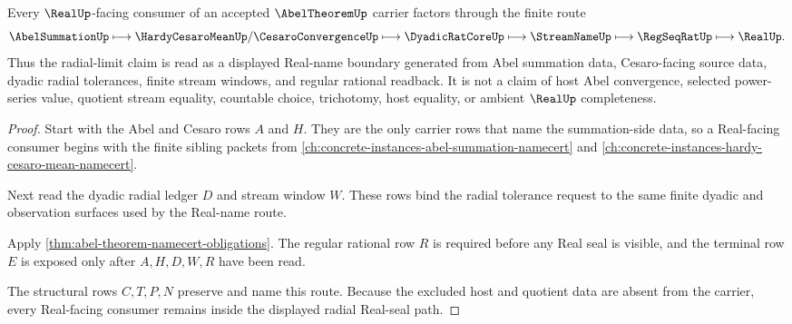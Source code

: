 \begin{theorem}
\label{thm:abel-theorem-radial-real-seal-route}
Every $\RealUp$-facing consumer of an accepted $\AbelTheoremUp$ carrier factors through the finite route
$$
\AbelSummationUp \longmapsto \HardyCesaroMeanUp/\CesaroConvergenceUp \longmapsto \DyadicRatCoreUp \longmapsto \StreamNameUp \longmapsto \RegSeqRatUp \longmapsto \RealUp .
$$
Thus the radial-limit claim is read as a displayed Real-name boundary generated from Abel summation data, Cesaro-facing source data, dyadic radial tolerances, finite stream windows, and regular rational readback. It is not a claim of host Abel convergence, selected power-series value, quotient stream equality, countable choice, trichotomy, host equality, or ambient $\RealUp$ completeness.
\end{theorem}
\begin{proof}
Start with the Abel and Cesaro rows $A$ and $H$. They are the only carrier rows that name the summation-side data, so a Real-facing consumer begins with the finite sibling packets from \autoref{ch:concrete-instances-abel-summation-namecert} and \autoref{ch:concrete-instances-hardy-cesaro-mean-namecert}.

Next read the dyadic radial ledger $D$ and stream window $W$. These rows bind the radial tolerance request to the same finite dyadic and observation surfaces used by the Real-name route.

Apply \autoref{thm:abel-theorem-namecert-obligations}. The regular rational row $R$ is required before any Real seal is visible, and the terminal row $E$ is exposed only after $A,H,D,W,R$ have been read.

The structural rows $C,T,P,N$ preserve and name this route. Because the excluded host and quotient data are absent from the carrier, every Real-facing consumer remains inside the displayed radial Real-seal path.
\end{proof}


